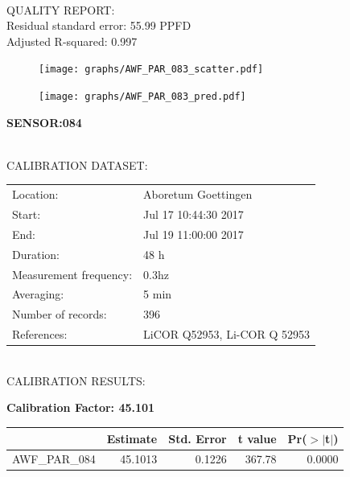 \documentclass[oneside]{report}
\begin{document}
\hrulefill\\
QUALITY REPORT:\\
Residual standard error: 55.99 PPFD\\
Adjusted R-squared: 0.997



\begin{figure}[H]
  \centering
  \texttt{[image: graphs/AWF\_PAR\_083\_scatter.pdf]}
\end{figure}




\begin{figure}[H]
  \centering
  \texttt{[image: graphs/AWF\_PAR\_083\_pred.pdf]}
\end{figure}

\pagebreak


\begin{center}
\large{\textbf{SENSOR:084}}\\
\end{center}

\hrulefill\\
CALIBRATION DATASET:\\
\begin{table}[h!]
  \centering
  \label{tab:table1}
  \begin{tabular}{ll}
    Location: & Aboretum Goettingen\\ 
    
    
    Start:  & Jul 17 10:44:30 2017 \\
    End:   & Jul 19 11:00:00 2017\\ 
    Duration: & 48 h\\
    Measurement frequency: & 0.3hz\\
    Averaging:  &5 min\\
    Number of records: & 396 \\
    References: & LiCOR Q52953, Li-COR Q 52953 \\
  \end{tabular}
\end{table}

\hrulefill\\
CALIBRATION RESULTS:\\


\begin{center}
\textbf{\large{Calibration Factor: 45.101}}\\
\end{center}
\begin{table}[ht]
\centering
\begin{tabular}{rrrrr}
  \hline
 & Estimate & Std. Error & t value & Pr($>$$|$t$|$) \\ 
  \hline
AWF\_PAR\_084 & 45.1013 & 0.1226 & 367.78 & 0.0000 \\ 
   \hline
\end{tabular}
\end{table}
\end{document}
